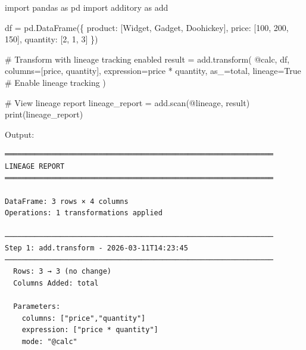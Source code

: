 \documentclass[
  letterpaper,
]{scrbook}
\newenvironment{Shaded}{\begin{snugshade}}{\end{snugshade}}
\newcommand{\BuiltInTok}[1]{\textcolor[rgb]{0.00,0.23,0.31}{#1}}
\newcommand{\CommentTok}[1]{\textcolor[rgb]{0.37,0.37,0.37}{#1}}
\newcommand{\DecValTok}[1]{\textcolor[rgb]{0.68,0.00,0.00}{#1}}
\newcommand{\ImportTok}[1]{\textcolor[rgb]{0.00,0.46,0.62}{#1}}
\newcommand{\NormalTok}[1]{\textcolor[rgb]{0.00,0.23,0.31}{#1}}
\newcommand{\OperatorTok}[1]{\textcolor[rgb]{0.37,0.37,0.37}{#1}}
\newcommand{\StringTok}[1]{\textcolor[rgb]{0.13,0.47,0.30}{#1}}
\newcommand{\VariableTok}[1]{\textcolor[rgb]{0.07,0.07,0.07}{#1}}
\begin{document}
\begin{Shaded}
\begin{Highlighting}[]
\ImportTok{import}\NormalTok{ pandas }\ImportTok{as}\NormalTok{ pd}
\ImportTok{import}\NormalTok{ additory }\ImportTok{as}\NormalTok{ add}

\NormalTok{df }\OperatorTok{=}\NormalTok{ pd.DataFrame(\{}
    \StringTok{\textquotesingle{}product\textquotesingle{}}\NormalTok{: [}\StringTok{\textquotesingle{}Widget\textquotesingle{}}\NormalTok{, }\StringTok{\textquotesingle{}Gadget\textquotesingle{}}\NormalTok{, }\StringTok{\textquotesingle{}Doohickey\textquotesingle{}}\NormalTok{],}
    \StringTok{\textquotesingle{}price\textquotesingle{}}\NormalTok{: [}\DecValTok{100}\NormalTok{, }\DecValTok{200}\NormalTok{, }\DecValTok{150}\NormalTok{],}
    \StringTok{\textquotesingle{}quantity\textquotesingle{}}\NormalTok{: [}\DecValTok{2}\NormalTok{, }\DecValTok{1}\NormalTok{, }\DecValTok{3}\NormalTok{]}
\NormalTok{\})}

\CommentTok{\# Transform with lineage tracking enabled}
\NormalTok{result }\OperatorTok{=}\NormalTok{ add.transform(}
    \StringTok{\textquotesingle{}@calc\textquotesingle{}}\NormalTok{,}
\NormalTok{    df,}
\NormalTok{    columns}\OperatorTok{=}\NormalTok{[}\StringTok{\textquotesingle{}price\textquotesingle{}}\NormalTok{, }\StringTok{\textquotesingle{}quantity\textquotesingle{}}\NormalTok{],}
\NormalTok{    expression}\OperatorTok{=}\StringTok{\textquotesingle{}price * quantity\textquotesingle{}}\NormalTok{,}
\NormalTok{    as\_}\OperatorTok{=}\StringTok{\textquotesingle{}total\textquotesingle{}}\NormalTok{,}
\NormalTok{    lineage}\OperatorTok{=}\VariableTok{True}  \CommentTok{\# Enable lineage tracking}
\NormalTok{)}

\CommentTok{\# View lineage report}
\NormalTok{lineage\_report }\OperatorTok{=}\NormalTok{ add.scan(}\StringTok{\textquotesingle{}@lineage\textquotesingle{}}\NormalTok{, result)}
\BuiltInTok{print}\NormalTok{(lineage\_report)}
\end{Highlighting}
\end{Shaded}

Output:

\begin{verbatim}
═══════════════════════════════════════════════════════════════
LINEAGE REPORT
═══════════════════════════════════════════════════════════════

DataFrame: 3 rows × 4 columns
Operations: 1 transformations applied

───────────────────────────────────────────────────────────────
Step 1: add.transform - 2026-03-11T14:23:45
───────────────────────────────────────────────────────────────
  Rows: 3 → 3 (no change)
  Columns Added: total
  
  Parameters:
    columns: ["price","quantity"]
    expression: ["price * quantity"]
    mode: "@calc"
\end{verbatim}
\end{document}
